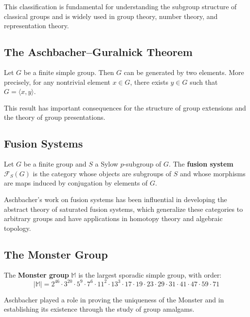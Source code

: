 This classification is fundamental for understanding the subgroup structure of classical groups and is widely used in group theory, number theory, and representation theory.

\subsection{The Aschbacher--Guralnick Theorem}

\begin{theorem}
Let $G$ be a finite simple group. Then $G$ can be generated by two elements. More precisely, for any nontrivial element $x \in G$, there exists $y \in G$ such that $G = \langle x, y \rangle$.
\end{theorem}

This result has important consequences for the structure of group extensions and the theory of group presentations.

\subsection{Fusion Systems}

\begin{definition}
Let $G$ be a finite group and $S$ a Sylow $p$-subgroup of $G$. The \textbf{fusion system} $\mathcal{F}_S(G)$ is the category whose objects are subgroups of $S$ and whose morphisms are maps induced by conjugation by elements of $G$.
\end{definition}

Aschbacher's work on fusion systems has been influential in developing the abstract theory of saturated fusion systems, which generalize these categories to arbitrary groups and have applications in homotopy theory and algebraic topology.

\subsection{The Monster Group}

\begin{definition}
The \textbf{Monster group} $\mathbb{M}$ is the largest sporadic simple group, with order:
\[
|\mathbb{M}| = 2^{46} \cdot 3^{20} \cdot 5^9 \cdot 7^6 \cdot 11^2 \cdot 13^3 \cdot 17 \cdot 19 \cdot 23 \cdot 29 \cdot 31 \cdot 41 \cdot 47 \cdot 59 \cdot 71
\]
\end{definition}

Aschbacher played a role in proving the uniqueness of the Monster and in establishing its existence through the study of group amalgams.

